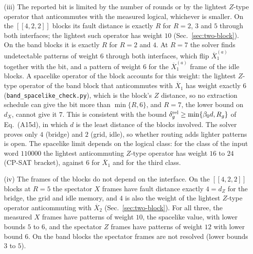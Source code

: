 \documentclass[aps,prx,reprint,superscriptaddress,nofootinbib,floatfix,longbibliography]{revtex4-2}
\theoremstyle{definition}
\begin{document}
(iii) The reported bit is limited by the number of rounds or by the lightest
$Z$-type operator that anticommutes with the measured logical, whichever is
smaller.  On the $[[4,2,2]]$ blocks its fault distance is exactly $R$ for
$R=2$, $3$ and $5$ through both interfaces; the lightest such operator has
weight $10$ (Sec.~\ref{sec:two-block}).  On the band blocks it is exactly $R$
for $R=2$ and $4$.  At $R=7$ the solver finds undetectable patterns of weight
$6$ through both interfaces, which flip $\overline X_1^{(a)}$ together with
the bit, and a pattern of weight $6$ for the $\overline X_1^{(a)}$ frame of
the idle blocks.  A spacelike operator of the block accounts for this weight:
the lightest $Z$-type operator of the band block that anticommutes with
$\overline X_1$ has weight exactly $6$ (\texttt{band\_spacelike\_check.py}),
which is the block's $Z$ distance, so no extraction schedule can give the bit
more than $\min\{R,6\}$, and $R=7$, the lower bound on $d_X$, cannot give it
$7$.  This is consistent with the bound
$\delta_g^{\rm rel}\ge\min\{\beta_0d,R_g\}$ of Eq.~(A15d), in which $d$ is
the least distance of the blocks involved.  The solver proves only $4$
(bridge) and $2$ (grid, idle), so whether routing adds lighter patterns is
open.  The spacelike limit depends on the logical class: for the class of the
input word $110000$ the lightest anticommuting $Z$-type operator has weight
$16$ to $24$ (CP-SAT bracket), against $6$ for $\overline X_1$ and for the
third class.

(iv) The frames of the blocks do not depend on the interface.  On the
$[[4,2,2]]$ blocks at $R=5$ the spectator $X$ frames have fault distance
exactly $4=d_Z$ for the bridge, the grid and idle memory, and $4$ is also the
weight of the lightest $Z$-type operator anticommuting with $\overline X_2$
(Sec.~\ref{sec:two-block}).  For all three, the measured $X$ frames have
patterns of weight $10$, the spacelike value, with lower bounds $5$ to $6$,
and the spectator $Z$ frames have patterns of weight $12$ with lower bound
$6$.  On the band blocks the spectator frames are not resolved (lower bounds
$3$ to $5$).
\end{document}

